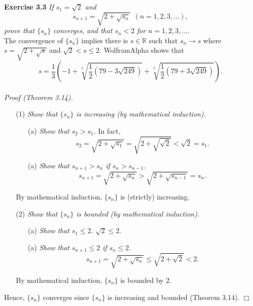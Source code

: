\documentclass{article}
\begin{document}



\textbf{Exercise 3.3}
\emph{If $s_1 = \sqrt{2}$ and
$$s_{n+1} = \sqrt{2+\sqrt{s_n}} \:\: (n=1,2,3,...),$$
prove that $\{s_n\}$ converges, and that $s_n < 2$ for $n=1,2,3,...$.} \\

The convergence of $\{s_n\}$
implies there is $s \in \mathbb{R}$ such that $s_n \to s$
where $s = \sqrt{2+\sqrt{s}}$ and $\sqrt{2} < s \leq 2$.
WolframAlpha shows that
$$s = \frac{1}{3}
\left(
-1 + \sqrt[3]{\frac{1}{2}(79 - 3 \sqrt{249})}
   + \sqrt[3]{\frac{1}{2}(79 + 3 \sqrt{249})}
\right).$$ \\

\emph{Proof (Theorem 3.14).}
\begin{enumerate}
\item[(1)]
\emph{Show that $\{s_n\}$ is increasing (by mathematical induction).}
  \begin{enumerate}
  \item[(a)]
  \emph{Show that $s_2 > s_1$.}
  In fact,
  $$s_2 = \sqrt{2+\sqrt{s_1}} = \sqrt{2+\sqrt{\sqrt{2}}} < \sqrt{2} = s_1.$$
  \item[(a)]
  \emph{Show that $s_{n+1} > s_{n}$ if $s_{n} > s_{n-1}$.}
  $$s_{n+1} = \sqrt{2+\sqrt{s_{n}}} > \sqrt{2+\sqrt{s_{n-1}}} = s_n.$$
  \end{enumerate}
By mathematical induction, $\{s_n\}$ is (strictly) increasing.
\item[(2)]
\emph{Show that $\{s_n\}$ is bounded (by mathematical induction).}
  \begin{enumerate}
  \item[(a)]
  \emph{Show that $s_1 \leq 2$.}
  $\sqrt{2} \leq 2$.
  \item[(a)]
  \emph{Show that $s_{n+1} \leq 2$ if $s_{n} \leq 2$.}
  $$s_{n+1} = \sqrt{2+\sqrt{s_{n}}} \leq \sqrt{2+\sqrt{2}} < 2.$$
  \end{enumerate}
By mathematical induction, $\{s_n\}$ is bounded by $2$.
\end{enumerate}
Hence, $\{s_n\}$ converges since $\{s_n\}$ is increasing and bounded (Theorem 3.14).
$\Box$ \\\\



\end{document}
